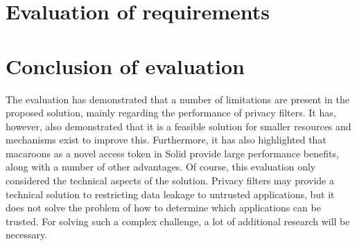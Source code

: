 \section{Evaluation of requirements}

\section{Conclusion of evaluation}
The evaluation has demonstrated that a number of limitations are present in the proposed solution, mainly regarding the performance of privacy filters. It has, however, also demonstrated that it is a feasible solution for smaller resources and mechanisms exist to improve this. Furthermore, it has also highlighted that macaroons as a novel access token in Solid provide large performance benefits, along with a number of other advantages. Of course, this evaluation only considered the technical aspects of the solution. Privacy filters may provide a technical solution to restricting data leakage to untrusted applications, but it does not solve the problem of how to determine which applications can be trusted. For solving such a complex challenge, a lot of additional research will be necessary. 
